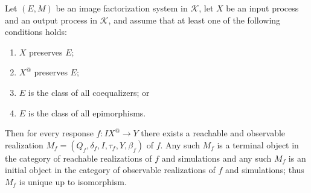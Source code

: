 Let $(E, M)$ be an image factorization system in $\mathcal{K}$, let $X$ be an input process and an output process in $\mathcal{K}$, and assume that at least one of the following conditions holds:

\begin{enumerate}
\item $X$ preserves $E$;
\item $X^@$ preserves $E$;
\item $E$ is the class of all coequalizers; or
\item $E$ is the class of all epimorphisms.
\end{enumerate}

Then for every response $f: IX^@ \longrightarrow Y$ there exists a reachable and observable realization $M_f = (Q_f, \delta_f, I, \tau_f, Y, \beta_f)$ of $f$. Any such $M_f$ is a terminal object in the category of reachable realizations of $f$ and simulations and any such $M_f$ is an initial object in the category of observable realizations of $f$ and simulations; thus $M_f$ is unique up to isomorphism.
